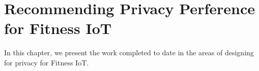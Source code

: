 \chapter{Recommending Privacy Perference for Fitness IoT}\label{chapter:fitnessIoT}
In this chapter, we present the work completed to date in the areas of designing for privacy for Fitness IoT.
